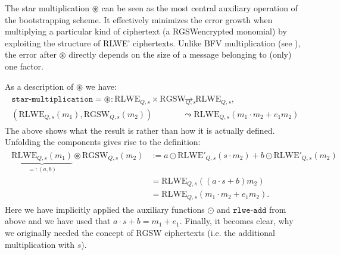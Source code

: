 \documentclass[letterpaper,10pt,english]{jupyterBook}
\begin{document}
\sphinxAtStartPar
The star multiplication \(\circledast\) can be seen as the most central auxiliary operation of the bootstrapping scheme.
It effectively minimizes the error growth when multiplying a particular kind of ciphertext (a RGSW\sphinxhyphen{}encrypted monomial) by exploiting the structure of RLWE’ ciphertexts.
Unlike BFV multiplication (see {\hyperref[\detokenize{Thesis:error-after-BFV-multiplication}]{}}), the error after \(\circledast\) directly depends on the size of a message belonging to (only) one factor.

\sphinxAtStartPar
As a description of \(\circledast\) we have:
\begin{equation*}
\begin{split}\begin{split}
\texttt{star-multiplication} = \circledast: \mathrm{RLWE}_{Q,s} \times \mathrm{RGSW}_{Q,s} &\longrightarrow \mathrm{RLWE}_{Q,s}, \\ (\mathrm{RLWE}_{Q,s}(m_1), \mathrm{RGSW}_{Q,s}(m_2)) &\leadsto \mathrm{RLWE}_{Q,s}(m_1\cdot m_2+e_1m_2)
\end{split}\end{split}
\end{equation*}
\sphinxAtStartPar
The above shows what the result is rather than how it is actually defined.
Unfolding the components gives rise to the definition:
\begin{equation*}
\begin{split}\begin{split}
\underbrace{\mathrm{RLWE}_{Q,s}(m_1)}_{=: (a,b)} \circledast \mathrm{RGSW}_{Q,s}(m_2) &:= a \odot \mathrm{RLWE'}_{Q,s}(s\cdot m_2) + b \odot \mathrm{RLWE'}_{Q,s}(m_2) \\
&= \mathrm{RLWE}_{Q,s}((a\cdot s +b)m_2) \\
&= \mathrm{RLWE}_{Q,s}(m_1\cdot m_2+e_1m_2).
\end{split}\end{split}
\end{equation*}
\sphinxAtStartPar
Here we have implicitly applied the auxiliary functions \(\odot\) and \(\texttt{rlwe-add}\) from above and we have used that \(a \cdot s + b = m_1 + e_1\).
Finally, it becomes clear, why we originally needed the concept of RGSW ciphertexts (i.e. the additional multiplication with \(s\)).
\end{document}
